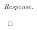 \documentclass[english]{article}
\theoremstyle{remark}
\theoremstyle{definition}
\begin{document}
\begin{proof}[Response]
\begin{enumerate}[label=\emph{(\roman*)}]
		\end{enumerate}
\end{proof}
\end{document}
